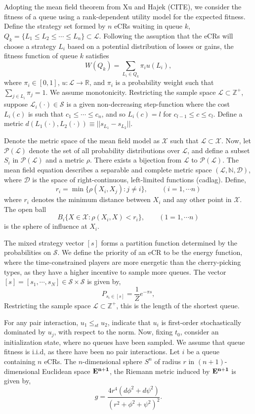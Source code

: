 \documentclass[10pt]{article}
\newcommand{\mcL}{\mathcal{L}}
\newcommand{\mcP}{\mathcal{P}}
\newcommand{\mcX}{\mathcal{X}}
\newcommand{\mcS}{\mathcal{S}}
\newcommand{\mcD}{\mathcal{D}}
\theoremstyle{definition}
\begin{document}
Adopting the mean field theorem from Xu and Hajek (CITE), we consider
the fitness of a queue using a rank-dependent utility model for
the expected fitness. Define the strategy set formed by $n$ eCRs waiting in queue $k$,
$Q_k = \lbrace L_1 \le L_2 \le\cdots \le L_n\rbrace \subset \mcL$.
Following the assuption that the eCRs will choose a strategy $L_i$
based on a potential distribution of losses or gains, the fitness function of
queue $k$ satisfies
$$
    W(Q_k) = \displaystyle\sum_{L_i\in Q_k} \pi_i u(L_i),
$$ 
where $\pi_i\in[0,1]$,
$u:\mcL \rightarrow\mathbb{R}$, and $\pi_i$ is a probability weight such
that $\sum_{j \in L_i}\pi_j = 1$. We assume monotonicity.
Restricting the sample space $\mcL\subset\mathbb{Z}^+$, suppose $\mcL_i(\cdot)\in \mcS$ is a given
non-decreasing step-function where the cost $L_i(c)$ is such that $c_1\le \cdots \le c_n$, and so $L_i(c) = l$ for $c_{l-1}\le c \le c_l$. 
Define a metric $d(L_1(\cdot), L_2(\cdot)) \equiv \vert\vert s_{L_1} -
s_{L_2}\vert\vert$. 

Denote the metric space of the mean field model as $\mcX$ such that $\mcL \subset \mcX$.
Now, let $\mcP(\mcL)$ denote the set of all probability distributions
over $\mcL$, and define a subset $S_i$ in $\mcP(\mcL)$ and a metric $\rho$.
There exists a bijection from $\mcL$ to $\mcP(\mcL)$.
The mean field equation describes a separable and complete metric space
$(\mcL, \mathbb{N}, \mcD)$, where $\mcD$ is the space of right-continuous,
left-limited functions (cadlag). Define,
$$
    r_i = \min\lbrace \rho(X_i, X_j) : j\ne i\rbrace, \qquad (i = 1, \cdots n)
$$
where $r_i$ denotes the minimum distance between $X_i$ and any other point in
$\mcX$. The open ball
$$
    B_i \lbrace X \in \mcX : \rho(X_i, X) < r_i\rbrace, \qquad (1 = 1, \cdots n)
$$
is the sphere of influence at $X_i$.

The mixed strategy vector $[s]$ forms a partition
function determined by the probabilities on $\mcS$. 
We define the priority of an eCR to be the energy function, where the
time-constrained players are more energetic than the cherry-picking types, as
they have a higher incentive to sample more queues.
The vector $[s] = [s_1, \cdots, s_N] \in \mcS\times\mcS$ is given by,
$$
    P_{s_i \in [s]} = \frac{1}{Z} e^{-\pi s},
$$
Restricting the sample space $\mcL\subset\mathbb{Z}^+$,
this is the length of the shortest queue.


For any pair interaction, 
$u_1 \le_{st} u_2$, indicate that $u_i$ is first-order stochastically
dominated by $u_j$, with respect to the norm. 
Now, fixing $t_0$, consider an initialization state, where no queues have been
sampled. We assume that queue fitness is i.i.d, as there
have been no pair interactions. 
Let $i$ be a queue containing $n$ eCRs. The $n$-dimensional sphere $S^n$
of radius $r$ in $(n+1)$-dimensional Euclidean space $\bf{E}^{n+1}$, the
Riemann metric induced by $\bf{E}^{n+1}$ is given by,
$$
    g = \frac{4r^4(d\phi^2 + d\psi^2)}{(r^2 + \phi^2 + \psi^2)^2}.
$$
\end{document}
